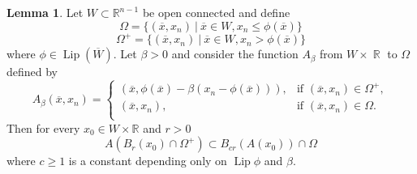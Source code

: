 \documentclass[12pt]{article}
\theoremstyle{definition}
\newtheorem{lemma}{Lemma}
\DeclareMathOperator\Lip{Lip}
\DeclareMathOperator\rr{\mathbb{R}}
\begin{document}
\begin{lemma}\label{lcircle}
Let $W \subset \mathbb{R}^{n-1}$ be open connected and define
\[\Omega =\{ (\overline x,x_n) \ |\ \overline x\in W, x_n\le \phi(\overline x)  \} \]
\[\Omega^+ =\{ (\overline x,x_n) \ |\ \overline x\in W, x_n> \phi(\overline x)  \} \]
where $\phi \in \Lip(\overline W)$. Let $\beta>0$ and consider the function $A_\beta$ from $W \times \rr$ to $\Omega$ defined by
\[ A_\beta(\overline x, x_n) =\begin{cases}
							(\overline x , \phi(\overline x)-\beta(x_n-\phi(\overline x))), & \text{if } (\overline x, x_n) \in \Omega^+ ,\\
							(\overline x, x_n), & \text{if } (\overline x, x_n) \in \Omega .\\
\end{cases}
\]
 Then for every $x_0 \in W \times \mathbb{R}$ and $r>0$
\[ A(B_r(x_0)\cap \Omega^+)\subset B_{cr}(A(x_0))\cap \Omega\]
where $c\ge 1$ is a constant depending only on $\Lip \phi$ and $\beta$.
\end{lemma}
\end{document}
